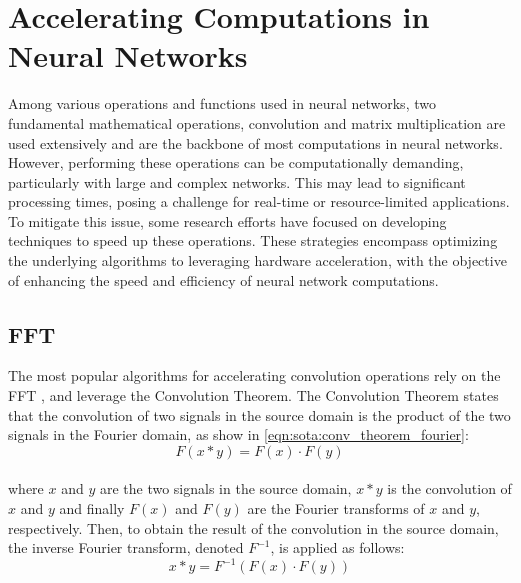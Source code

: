 \section{Accelerating Computations in Neural Networks}\label{sec:sota:fast_convolutions}


Among various operations and functions used in neural networks, two fundamental
mathematical operations, convolution and matrix multiplication are used
extensively and are the backbone of most computations in neural networks.
However, performing these operations can be computationally demanding,
particularly with large and complex networks. This may lead to significant
processing times, posing a challenge for real-time or resource-limited
applications. To mitigate this issue, some research efforts have focused on
developing techniques to speed up these operations. These strategies encompass
optimizing the underlying algorithms to leveraging hardware acceleration, with
the objective of enhancing the speed and efficiency of neural network
computations.\\


\subsection{\acl{FFT}}\label{sec:sota:fft}
The most popular algorithms for
accelerating convolution operations rely on the \ac{FFT}
\cite{DBLP:conf/nips/ChiJM20,DBLP:journals/npl/LinY19,DBLP:conf/pkdd/PrattWCZ17},
and leverage the Convolution Theorem. The Convolution Theorem states that the
convolution of two signals in the source domain is the product of the two
signals in the Fourier domain, as show in \cref{eqn:sota:conv_theorem_fourier}:\\

\begin{equation}
  \label{eqn:sota:conv_theorem_fourier}
  F(x * y) = F(x) \cdot F(y)
\end{equation}\\

\noindent where $x$ and $y$ are the two signals in the source domain, $x*y$ is
the convolution of $x$ and $y$ and finally $F(x)$ and $F(y)$ are the Fourier
transforms of $x$ and $y$, respectively. Then, to obtain the result of the
convolution in the source domain, the inverse Fourier transform, denoted
$F^{-1}$, is applied as follows:\\

\begin{equation}
  x * y = F^{-1}(F(x) \cdot F(y))
\end{equation}\\


